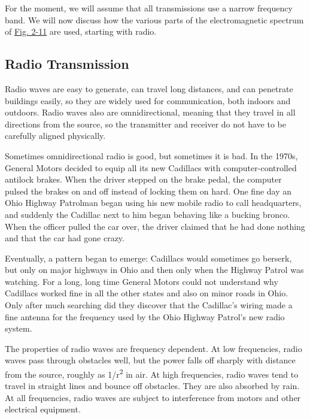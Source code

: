 For the moment, we will assume that all transmissions use a narrow
frequency band. We will now discuss how the various parts of the
electromagnetic spectrum of
\protect\hyperlink{0130661023_ch02lev1sec3.htmlux5cux23ch02fig11}{Fig.
2-11} are used, starting with radio.

\protect\hypertarget{0130661023_ch02lev1sec3.htmlux5cux23ch02lev2sec9}{}{}

\subsection{Radio Transmission}

Radio waves are easy to generate, can travel long distances, and can
penetrate buildings easily, so they are widely used for communication,
both indoors and outdoors. Radio waves also are omnidirectional, meaning
that they travel in all directions from the source, so the transmitter
and receiver do not have to be carefully aligned physically.

Sometimes omnidirectional radio is good, but sometimes it is bad. In the
1970s, General Motors decided to equip all its new Cadillacs with
computer-controlled antilock brakes. When the driver stepped on the
brake pedal, the computer pulsed the brakes on and off instead of
locking them on hard. One fine day an Ohio Highway Patrolman began using
his new mobile radio to call headquarters, and suddenly the Cadillac
next to him began behaving like a bucking bronco. When the officer
pulled the car over, the driver claimed that he had done nothing and
that the car had gone crazy.

Eventually, a pattern began to emerge: Cadillacs would sometimes go
berserk, but only on major highways in Ohio and then only when the
Highway Patrol was watching. For a long, long time General Motors could
not understand why Cadillacs worked fine in all the other states and
also on minor roads in Ohio. Only after much searching did they discover
that the Cadillac's wiring made a fine antenna for the frequency used by
the Ohio Highway Patrol's new radio system.

The properties of radio waves are frequency dependent. At low
frequencies, radio waves pass through obstacles well, but the power
falls off sharply with distance from the source, roughly as
1{/r}\textsuperscript{2} in air. At high frequencies, radio waves tend
to travel in straight lines and bounce off obstacles. They are also
absorbed by rain. At all frequencies, radio waves are subject to
interference from motors and other electrical equipment.

